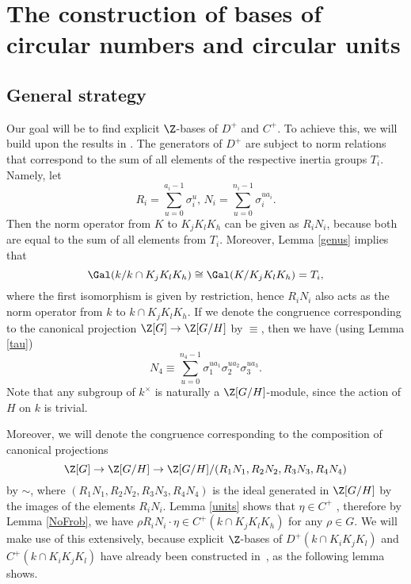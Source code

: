 \chapter{The construction of bases of circular numbers and circular units}\label{bases}

\section{General strategy}
Our goal will be to find explicit $\Z$-bases of $D^+$ and $C^+$.%
 To achieve this, we will build upon the results in \citep{Kucera2016}. The generators of $D^+$ are subject to norm relations that correspond to the sum of all elements of the respective inertia groups $T_i$. Namely, let $$R_i=\sum_{u=0}^{a_i-1}\sigma_i^u,\, N_i=\sum_{u=0}^{n_i-1}\sigma_i^{ua_i}.$$ 
Then the norm operator from $K$ to $K_jK_lK_h$ can be given as $R_iN_i$, because both are equal to the sum of all elements from $T_i$. Moreover, Lemma \ref{genus} implies that $$\Gal(k/k\cap K_jK_lK_h)\cong \Gal(K/ K_jK_lK_h)=T_i,$$
where the first isomorphism is given by restriction, hence $R_iN_i$ also acts as the norm operator from $k$ to $k\cap K_jK_lK_h$.
If we denote the congruence corresponding to the canonical projection $\Z[G]\to \Z[G/H]$ by $\equiv$, then we have (using Lemma \ref{tau}) $$N_4\equiv \sum_{u=0}^{n_4-1}\sigma_1^{ua_1}\sigma_2^{ua_2}\sigma_3^{ua_3}.$$ Note that any subgroup of $k^{\times}$ is naturally a $\Z[G/H]$-module, since the action of $H$ on $k$ is trivial.

Moreover, we will denote the congruence corresponding to the composition of canonical projections $$\Z[G]\to \Z[G/H]\to \Z[G/H]/(R_1N_1,R_2N_2,R_3N_3,R_4N_4)$$ by $\sim$, where $(R_1N_1,R_2N_2,R_3N_3,R_4N_4)$ is the ideal generated in $\Z[G/H]$ by the images of the elements $R_iN_i$. Lemma \ref{units} shows that $\eta\in C^+$ , therefore 
by Lemma \ref{NoFrob}, we have $\rho R_iN_i\cdot \eta\in C^+(k\cap K_jK_lK_h)$ for any $\rho\in G$. %
We will make use of this extensively, because explicit $\Z$-bases of $D^+(k\cap K_iK_jK_l)$ and $C^+(k\cap K_iK_jK_l)$ have already been constructed in~\citep{Kucera2016}, as the following lemma shows.

